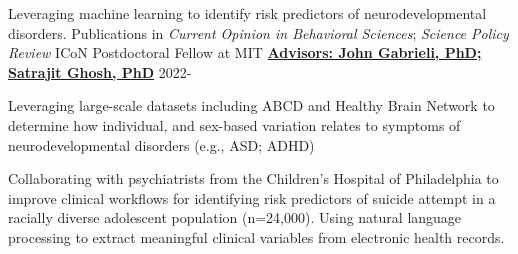 

\begin{cventries}

  \cventry
    {Leveraging machine learning to identify risk predictors of neurodevelopmental disorders. Publications in \textit{Current Opinion in Behavioral Sciences}; \textit{Science Policy Review}}
    {ICoN Postdoctoral Fellow at MIT} %
    {\href{https://maedbhk.github.io/MIT-Projects/}{\textbf{Advisors: John Gabrieli, PhD; Satrajit Ghosh, PhD}}}
    {2022-} %
    {
      \begin{cvitems} %
		\item {Leveraging large-scale datasets including ABCD and Healthy Brain Network to determine how individual, and sex-based variation relates to symptoms of neurodevelopmental disorders (e.g., ASD; ADHD)}
		\item {Collaborating with psychiatrists from the Children's Hospital of Philadelphia to improve clinical workflows for identifying risk predictors of suicide attempt in a racially diverse adolescent population (n=24,000). Using natural language processing to extract meaningful clinical variables from electronic health records.}
		\end{cvitems}
    }


\end{cventries}
